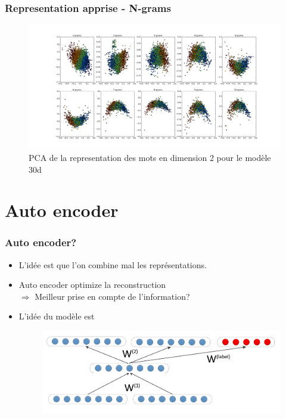 \documentclass{beamer}
\begin{document}
\begin{frame}
\frametitle{Representation apprise - N-grams}
\begin{figure}[htp]
\centering
\includegraphics[scale=0.2]{fig/n_gram.png}
\caption[caption]{PCA de la representation des mots en dimension 2 pour le modèle 30d}
\end{figure}

\end{frame}


\section{Auto encoder}
\begin{frame}
\frametitle{Auto encoder?}
\begin{itemize}
\item L'idée est que l'on combine mal les représentations.
\item Auto encoder optimize la reconstruction\\
$\Rightarrow$ Meilleur prise en compte de l'information?
\item L'idée du modèle est
\begin{figure}[htp]
\centering
\includegraphics[scale=0.2]{fig/model_RAE.png}
\label{}
\end{figure}
\end{itemize}
\end{frame}
\end{document}
